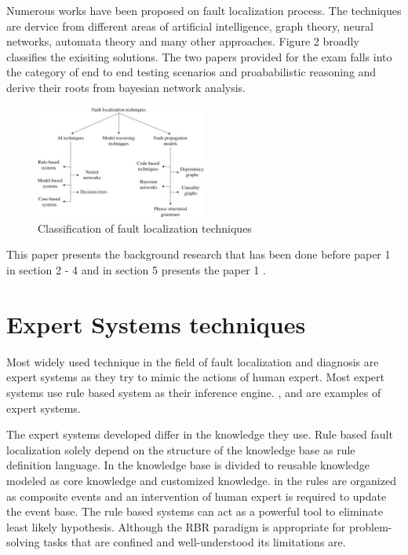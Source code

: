 \documentclass[10pt]{sigplan-proc-varsize}
\begin{document}
Numerous works have been proposed on fault localization process. The techniques are dervice from different areas of artificial intelligence, graph theory, 
neural networks, automata theory and many other approaches. Figure 2 broadly classifies the exisiting solutions. The two papers provided for the exam falls into the 
category of end to end testing scenarios and proababilistic reasoning and derive their roots from bayesian network analysis. 

\begin{figure}[h!]
  \caption{Classification of fault localization techniques}
  \centering
    \includegraphics[width=0.5\textwidth]{Fig2}
\end{figure}

This paper presents the background research that has been done before paper 1 in section 2 - 4 and in section 5 presents the paper 1 \cite{pclee:07}.

\section{Expert Systems techniques}
Most widely used technique in the field of fault localization and diagnosis are expert systems as they try to mimic the actions of human expert. 
Most expert systems use rule based system as their inference engine. \cite{Peng:97},\cite{Liu:99} and \cite{Nygate:95} are examples of expert systems.

The expert systems developed differ in the knowledge they use. Rule based fault localization solely depend on the 
structure of the knowledge base as rule definition language. In \cite{Lor:93}   the knowledge base is divided to reusable 
knowledge modeled as core knowledge and customized knowledge.  in  \cite{Liu:99} the rules are organized as composite events and 
an intervention of human expert is required to update the event base.  The rule based systems can act as a powerful tool to eliminate 
least likely hypothesis. Although the RBR paradigm is appropriate for problem-solving tasks that are confined and well-understood its limitations are.
\end{document}
